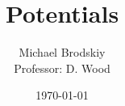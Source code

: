 


\title{Potentials}
\date{\today}
\author{Michael Brodskiy\\ \small Professor: D. Wood}



\maketitle

